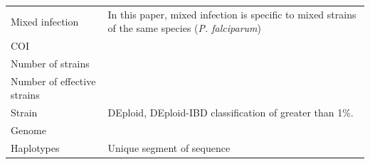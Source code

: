 \documentclass[9pt,lineno]{elife}
\begin{document}
\begin{appendixbox}
\begin{center}
  \begin{tabular}{p{3cm}|p{8cm}}\toprule
    Mixed infection & In this paper, mixed infection is specific to mixed strains of the same species ({\it P. falciparum})\\
    COI & \\
    Number of strains & \\
    Number of effective strains & \\
    Strain & DEploid, DEploid-IBD classification of greater than 1\%.{}\\
    Genome & \\
    Haplotypes & Unique segment of sequence\\\bottomrule
  \end{tabular}
\end{center}



\end{appendixbox}
\end{document}
